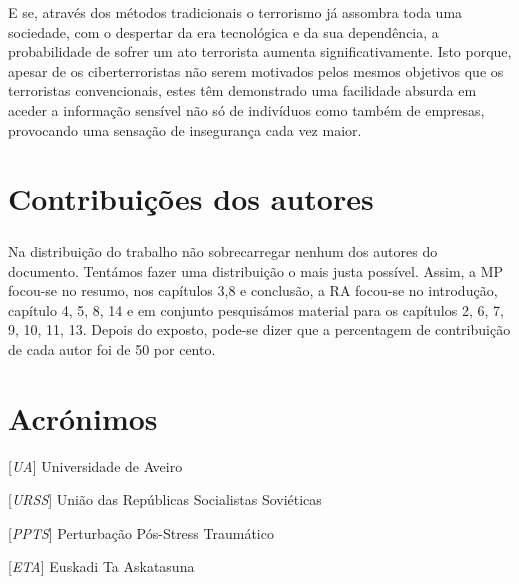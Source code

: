 \documentclass{report}
\begin{document}
E se, através dos métodos tradicionais o terrorismo já assombra toda uma sociedade, com o despertar da era tecnológica e da sua dependência, a probabilidade de sofrer um ato terrorista aumenta significativamente. Isto porque, apesar de os ciberterroristas não serem motivados pelos mesmos objetivos que os terroristas convencionais, estes têm demonstrado uma facilidade absurda em aceder a informação sensível não só de indivíduos como também de empresas, provocando uma sensação de insegurança cada vez maior. 



\chapter*{Contribuições dos autores}

\paragraph{} Na distribuição do trabalho não sobrecarregar nenhum dos autores do documento. Tentámos fazer uma distribuição o mais justa possível. Assim, a MP focou-se no resumo, nos capítulos 3,8 e conclusão, a RA focou-se no introdução, capítulo 4, 5, 8, 14 e em conjunto pesquisámos material para os capítulos 2, 6, 7, 9, 10, 11, 13.
Depois do exposto, pode-se dizer que a percentagem de contribuição de cada autor foi de 50 por cento.

\chapter*{Acrónimos}

\begin{acronym}
[\textit{UA}] {Universidade de Aveiro}
\end{acronym}


\begin{acronym}
[\textit{URSS}] {União das Repúblicas Socialistas Soviéticas}
\end{acronym}


\begin{acronym}
[\textit{PPTS}] {Perturbação Pós-Stress Traumático}
\end{acronym}


\begin{acronym}
[\textit{ETA}] {Euskadi Ta Askatasuna}
\end{acronym}
\end{document}
